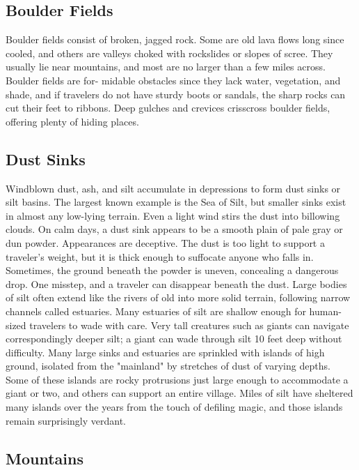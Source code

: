 \begin{multicols}{2}

\subsection{Boulder Fields}

Boulder fields consist of broken, jagged rock. Some are old lava flows long
since cooled, and others are valleys choked with rockslides or slopes of scree.
They usually lie near mountains, and most are no larger than a few miles across.
Boulder fields are for- midable obstacles since they lack water, vegetation,
and shade, and if travelers do not have sturdy boots or sandals, the sharp
rocks can cut their feet to ribbons. Deep gulches and crevices crisscross
boulder fields, offering plenty of hiding places.

\subsection{Dust Sinks}

Windblown dust, ash, and silt accumulate in depressions to form dust sinks or
silt basins. The largest known example is the Sea of Silt, but smaller sinks
exist in almost any low-lying terrain. Even a light wind stirs the dust into
billowing clouds. On calm days, a dust sink appears to be a smooth plain of
pale gray or dun powder. Appearances are deceptive. The dust is too light to
support a traveler's weight, but it is thick enough to suffocate anyone who
falls in. Sometimes, the ground beneath the powder is uneven, concealing a
dangerous drop. One misstep, and a traveler can disappear beneath the dust.
Large bodies of silt often extend like the rivers of old into more solid
terrain, following narrow channels called estuaries. Many estuaries of silt
are shallow enough for human-sized travelers to wade with care. Very tall
creatures such as giants can navigate correspondingly deeper silt; a giant
can wade through silt 10 feet deep without difficulty. Many large sinks and
estuaries are sprinkled with islands of high ground, isolated from the
"mainland" by stretches of dust of varying depths. Some of these islands are
rocky protrusions just large enough to accommodate a giant or two, and others
can support an entire village. Miles of silt have sheltered many islands over
the years from the touch of defiling magic, and those islands remain
surprisingly verdant.

\subsection{Mountains}


\end{multicols}
